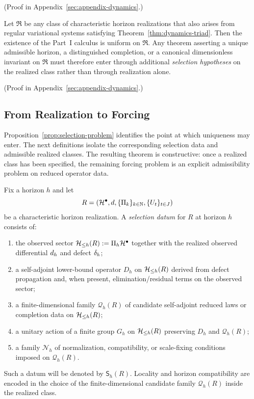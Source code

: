 (Proof in Appendix~\ref{sec:appendix-dynamics}.)

\begin{proposition}
\label{prop:selection-problem}
Let $\mathfrak R$ be any class of characteristic horizon realizations that also
arises from regular variational systems satisfying
Theorem~\ref{thm:dynamics-triad}. Then the existence of the Part~I calculus is
uniform on $\mathfrak R$. Any theorem asserting a unique admissible horizon, a
distinguished completion, or a canonical dimensionless invariant on
$\mathfrak R$ must therefore enter through additional \emph{selection
hypotheses} on the realized class rather than through realization alone.
\end{proposition}

(Proof in Appendix~\ref{sec:appendix-dynamics}.)

\subsection{From Realization to Forcing}

Proposition~\ref{prop:selection-problem} identifies the point at which
uniqueness may enter. The next definitions isolate the corresponding selection
data and admissible realized classes. The resulting theorem is constructive:
once a realized class has been specified, the remaining forcing problem is an
explicit admissibility problem on reduced operator data.

\begin{definition}
\label{def:selection-datum}
Fix a horizon $h$ and let
\[
R=(\cH^\bullet,d,\{\CCPi{k}\}_{k\in\bbN},\{U_t\}_{t\in J})
\]
be a characteristic horizon realization. A \emph{selection datum} for $R$ at
horizon $h$ consists of:
\begin{enumerate}[label=(\roman*), leftmargin=2em, itemsep=0.2em]
\item the observed sector $\CCHobs{h}(R):=\CCPi{h}\cH^\bullet$ together with the
      realized observed differential $\CCObs{d}{h}$ and defect
      $\CCDefect{d}{h}$;
\item a self-adjoint lower-bound operator $D_h$ on $\CCHobs{h}(R)$ derived from
      defect propagation and, when present, elimination/residual terms on the
      observed sector;
\item a finite-dimensional family $\mathcal Q_h(R)$ of candidate self-adjoint
      reduced laws or completion data on $\CCHobs{h}(R)$;
\item a unitary action of a finite group $G_h$ on $\CCHobs{h}(R)$ preserving
      $D_h$ and $\mathcal Q_h(R)$;
\item a family $\mathcal N_h$ of normalization, compatibility, or scale-fixing
      conditions imposed on $\mathcal Q_h(R)$.
\end{enumerate}
Such a datum will be denoted by $\mathsf S_h(R)$.
Locality and horizon compatibility are encoded in the choice of the
finite-dimensional candidate family $\mathcal Q_h(R)$ inside the realized
class.
\end{definition}

